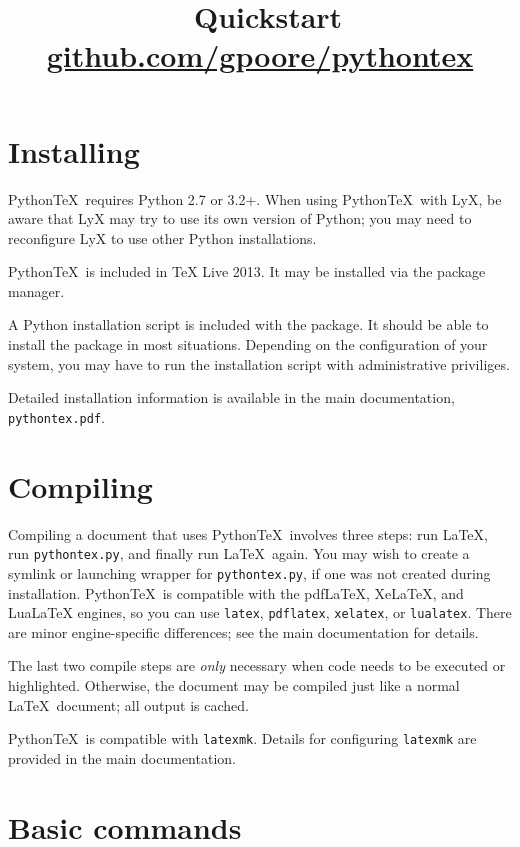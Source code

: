 \documentclass[twocolumn]{article}
\title{\vspace{-0.6in} \pytex\ Quickstart \\ {\normalsize \href{https://github.com/gpoore/pythontex}{github.com/gpoore/pythontex}}}
\author{}
\date{}
\newcommand{\pytex}{Python\TeX}
\begin{document}
\maketitle




\section*{Installing}

\pytex\ requires Python 2.7 or 3.2+.  When using \pytex\ with LyX, be aware that LyX may try to use its own version of Python; you may need to reconfigure LyX to use other Python installations.

\pytex\ is included in TeX Live 2013.  It may be installed via the package manager.

A Python installation script is included with the package.  It should be able to install the package in most situations.  Depending on the configuration of your system, you may have to run the installation script with administrative priviliges.

Detailed installation information is available in the main documentation, \texttt{pythontex.pdf}.

\section*{Compiling}

Compiling a document that uses \pytex\ involves three steps:  run \LaTeX, run \texttt{pythontex.py}, and finally run \LaTeX\ again.  You may wish to create a symlink or launching wrapper for \texttt{pythontex.py}, if one was not created during installation.  \pytex\ is compatible with the pdfLaTeX, XeLaTeX, and LuaLaTeX engines, so you can use \texttt{latex}, \texttt{pdflatex}, \texttt{xelatex}, or \texttt{lualatex}.  There are minor engine-specific differences; see the main documentation for details.

The last two compile steps are \emph{only} necessary when code needs to be executed or highlighted.  Otherwise, the document may be compiled just like a normal \LaTeX\ document; all output is cached.

\pytex\ is compatible with \texttt{latexmk}.  Details for configuring \texttt{latexmk} are provided in the main documentation.



\section*{Basic commands}
\end{document}
